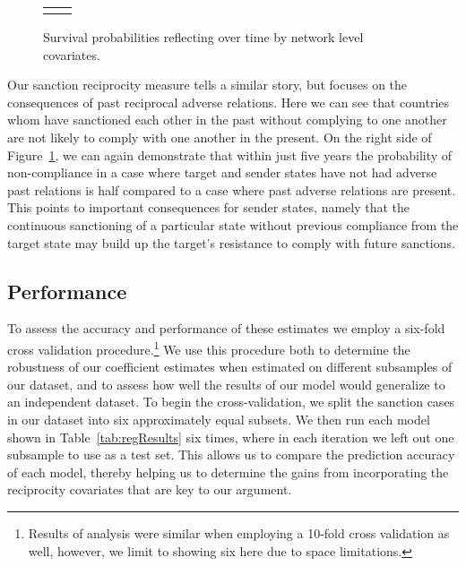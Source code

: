 \begin{figure}[ht]
	\centering
	\caption{Survival probabilities reflecting over time by network level covariates.}
	\begin{tabular}{cc}

	\subfloat[Subfigure 1][Compliance Reciprocity]{
		\resizebox{.45\textwidth}{!}{}
		\label{fig:compSancSurv}} & 
	
	\subfloat[Subfigure 2][Sanction Reciprocity]{
		\resizebox{.45\textwidth}{!}{}
		\label{fig:compSancSurv}}	

	\end{tabular}

	\label{fig:surv3}	
\end{figure}


Our sanction reciprocity measure tells a similar story, but focuses on the consequences of past reciprocal adverse relations. Here we can see that countries whom have sanctioned each other in the past without complying to one another are not likely to comply with one another in the present. On the right side of Figure~\ref{fig:surv3}, we can again demonstrate that within just five years the probability of non-compliance in a case where target and sender states have not had adverse past relations is half compared to a case where past adverse relations are present. This points to important consequences for sender states, namely that the continuous sanctioning of a particular state without previous compliance from the target state may build up the target's resistance to comply with future sanctions.

\subsection*{Performance}

To assess the accuracy and performance of these estimates we employ a six-fold cross validation procedure.\footnote{Results of analysis were similar when employing a 10-fold cross validation as well, however, we limit to showing six here due to space limitations.} We use this procedure both to determine the robustness of our coefficient estimates when estimated on different subsamples of our dataset, and to assess how well the results of our model would generalize to an independent dataset. To begin the cross-validation, we split the sanction cases in our dataset into six approximately equal subsets. We then run each model shown in Table~\ref{tab:regResults} six times, where in each iteration we left out one subsample to use as a test set. This allows us to compare the prediction accuracy of each model, thereby helping us to determine the gains from incorporating the reciprocity covariates that are key to our argument.

